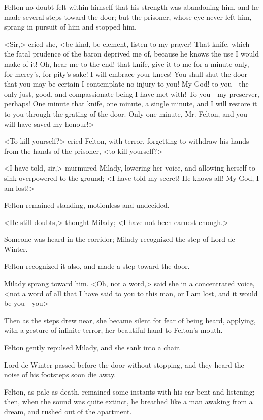 Felton no doubt felt within himself that his strength was abandoning him, and he made several steps toward the door; but the prisoner, whose eye never left him, sprang in pursuit of him and stopped him. 

<Sir,> cried she, <be kind, be clement, listen to my prayer! That knife, which the fatal prudence of the baron deprived me of, because he knows the use I would make of it! Oh, hear me to the end! that knife, give it to me for a minute only, for mercy's, for pity's sake! I will embrace your knees! You shall shut the door that you may be certain I contemplate no injury to you! My God! to you---the only just, good, and compassionate being I have met with! To you---my preserver, perhaps! One minute that knife, one minute, a single minute, and I will restore it to you through the grating of the door. Only one minute, Mr. Felton, and you will have saved my honour!> 

<To kill yourself?> cried Felton, with terror, forgetting to withdraw his hands from the hands of the prisoner, <to kill yourself?> 

<I have told, sir,> murmured Milady, lowering her voice, and allowing herself to sink overpowered to the ground; <I have told my secret! He knows all! My God, I am lost!> 

Felton remained standing, motionless and undecided. 

<He still doubts,> thought Milady; <I have not been earnest enough.> 

Someone was heard in the corridor; Milady recognized the step of Lord de Winter. 

Felton recognized it also, and made a step toward the door. 

Milady sprang toward him. <Oh, not a word,> said she in a concentrated voice, <not a word of all that I have said to you to this man, or I am lost, and it would be you---you\longdash> 

Then as the steps drew near, she became silent for fear of being heard, applying, with a gesture of infinite terror, her beautiful hand to Felton's mouth. 

Felton gently repulsed Milady, and she sank into a chair. 

Lord de Winter passed before the door without stopping, and they heard the noise of his footsteps soon die away. 

Felton, as pale as death, remained some instants with his ear bent and listening; then, when the sound was quite extinct, he breathed like a man awaking from a dream, and rushed out of the apartment. 

